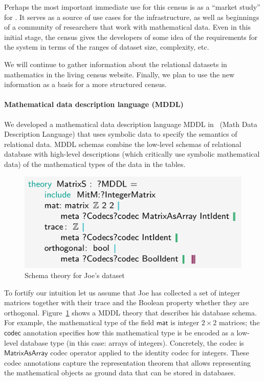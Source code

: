 Perhaps the most important immediate use for this census is as a 
``market study'' for \dmh.
It serves as a source of use cases for the infrastructure,
as well as beginnings of a community of researchers that work with mathematical data.
Even in this initial stage, the census gives the developers of \dmh
some idea of the requirements for the system in terms of the ranges of
dataset size, complexity, etc.

We will continue to gather information about the relational datasets 
in mathematics in the living census website.
Finally, we plan to use the new information as a basis for a more structured census.

\paragraph{Mathematical data description language (MDDL)}
We developed a mathematical data description language MDDL in~\cite{BerKohRab:tumdi19} (Math Data Description Language) that uses symbolic data to specify the semantics of relational data.
MDDL schemas combine the low-level schemas of relational database with high-level descriptions (which critically use symbolic mathematical data) of the mathematical types of the data in the tables.

\begin{figure}[ht]
  \includegraphics[width=.48\textwidth]{data_joe-schema}
  \caption{Schema theory for Joe's dataset}\label{fig:joe-schema}
\end{figure}

To fortify our intuition let us assume that Joe has collected a set of integer matrices together with their trace
and the Boolean property whether they are orthogonal.
Figure~\ref{fig:joe-schema} shows a MDDL theory that describes his database schema.
For example, the mathematical type of the field $\mathsf{mat}$ is integer $2\times2$ matrices;
the $\mathsf{codec}$ annotation specifies how this mathematical type is be encoded as a low-level database type (in this case: arrays of integers).
Concretely, the codec is $\mathsf{MatrixAsArray}$ codec operator applied to the identity codec for integers.
These codec annotations capture the representation theorem that allows representing the mathematical objects as ground data that can be stored in databases. 

